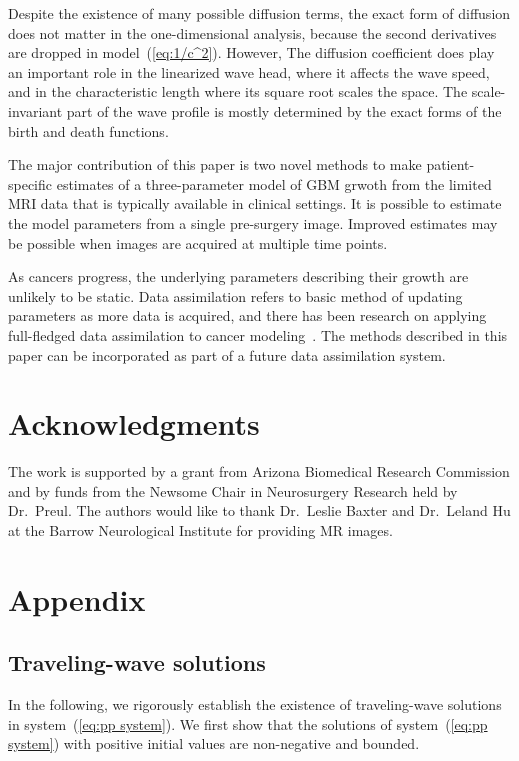 \documentclass{aims}
\numberwithin{equation}{section}
\begin{document}
Despite the existence of many possible diffusion terms,
the exact form of diffusion does not matter in the one-dimensional analysis, because
the second derivatives are dropped in model~(\ref{eq:1/c^2}).  However,
The diffusion coefficient does play an important role in the linearized
wave head, where it affects the wave speed, and in the characteristic length
where its square root scales the space.  The scale-invariant
part of the wave profile is mostly determined by the exact forms of the
birth and death functions. 

The major contribution of this paper is two novel methods
to make patient-specific estimates of a three-parameter model of
GBM grwoth from the limited MRI data that is typically available in clinical settings.
It is possible to estimate the model parameters from a single pre-surgery image.
Improved estimates may be possible when images are acquired at multiple time points.

As cancers progress, the underlying parameters describing their growth are unlikely to be
static.  Data assimilation refers to basic method of updating parameters as more data is
acquired, and there has been research on applying full-fledged  data assimilation to cancer
modeling~\cite{Kostelich2011,McDaniel2013}.  The methods described in this paper can be
incorporated as part of a future data assimilation system.

\section*{Acknowledgments}
The work is supported
by a grant from Arizona Biomedical Research Commission
and by funds from the Newsome Chair in Neurosurgery Research held by Dr.\ Preul.
The authors would like to thank Dr.\ Leslie Baxter and Dr.\ Leland Hu at the Barrow
Neurological Institute for providing MR images.






\section*{Appendix}
\subsection*{Traveling-wave solutions}
In the following, we rigorously establish the existence of traveling-wave solutions in
system~(\ref{eq:pp system}).  We first show that the solutions of
system~(\ref{eq:pp system}) with positive initial values are non-negative and bounded.
 
\end{document}
